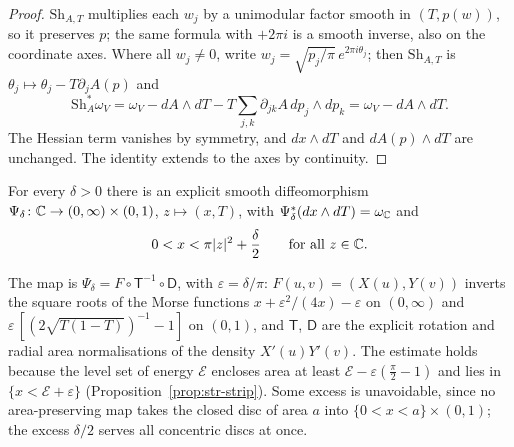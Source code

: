 \begin{proof}
$\mathrm{Sh}_{A,T}$ multiplies each $w_j$ by a unimodular factor smooth in $(T,p(w))$, so it preserves $p$; the same formula with $+2\pi i$ is a smooth inverse, also on the coordinate axes. Where all $w_j\ne0$, write $w_j=\sqrt{p_j/\pi}\,e^{2\pi i\theta_j}$; then $\mathrm{Sh}_{A,T}$ is $\theta_j\mapsto\theta_j-T\partial_jA(p)$ and
\[
\mathrm{Sh}_A^*\omega_V=\omega_V-dA\wedge dT-T\sum_{j,k}\partial_{jk}A\,dp_j\wedge dp_k=\omega_V-dA\wedge dT .
\]
The Hessian term vanishes by symmetry, and $dx\wedge dT$ and $dA(p)\wedge dT$ are unchanged. The identity extends to the axes by continuity.
\end{proof}

\begin{proposition}\label{prop:hdl-strip}
For every $\delta>0$ there is an explicit smooth diffeomorphism
$\Psi_\delta\colon\mathbb{C}\to(0,\infty)\times(0,1)$, $z\mapsto(x,T)$, with $\Psi_\delta^*(dx\wedge dT)=\omega_{\mathbb{C}}$ and
\[
 0<x<\pi|z|^2+\frac\delta2\qquad\text{for all }z\in\mathbb{C} .
\]
\end{proposition}

The map is $\Psi_\delta=F\circ\mathsf T^{-1}\circ\mathsf D$, with $\varepsilon=\delta/\pi$: $F(u,v)=(X(u),Y(v))$ inverts the square roots of the Morse functions $x+\varepsilon^2/(4x)-\varepsilon$ on $(0,\infty)$ and $\varepsilon\,[(2\sqrt{T(1-T)})^{-1}-1]$ on $(0,1)$, and $\mathsf T$, $\mathsf D$ are the explicit rotation and radial area normalisations of the density $X'(u)Y'(v)$. The estimate holds because the level set of energy $\mathcal E$ encloses area at least $\mathcal E-\varepsilon(\frac\pi2-1)$ and lies in $\{x<\mathcal E+\varepsilon\}$ (Proposition~\ref{prop:str-strip}). Some excess is unavoidable, since no area-preserving map takes the closed disc of area $a$ into $\{0<x<a\}\times(0,1)$; the excess $\delta/2$ serves all concentric discs at once.
